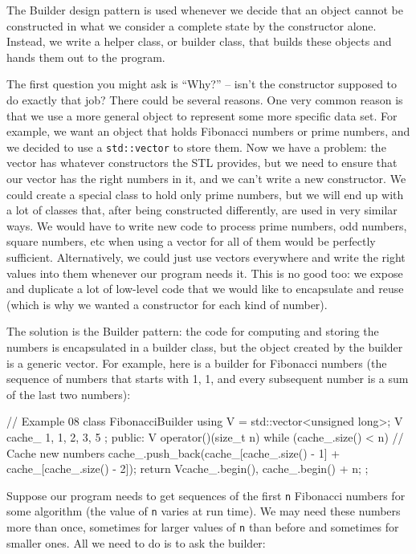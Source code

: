 The Builder design pattern is used whenever we decide that an object cannot be constructed in what we consider a complete state by the constructor alone. Instead, we write a helper class, or builder class, that builds these objects and hands them out to the program.

The first question you might ask is ``Why?'' -- isn't the constructor supposed to do exactly that job? There could be several reasons. One very common reason is that we use a more general object to represent some more specific data set. For example, we want an object that holds Fibonacci numbers or prime numbers, and we decided to use a \texttt{std::vector} to store them. Now we have a problem: the vector has whatever constructors the STL provides, but we need to ensure that our vector has the right numbers in it, and we can't write a new constructor. We could create a special class to hold only prime numbers, but we will end up with a lot of classes that, after being constructed differently, are used in very similar ways. We would have to write new code to process prime numbers, odd numbers, square numbers, etc when using a vector for all of them would be perfectly sufficient. Alternatively, we could just use vectors everywhere and write the right values into them whenever our program needs it. This is no good too: we expose and duplicate a lot of low-level code that we would like to encapsulate and reuse (which is why we wanted a constructor for each kind of number).

The solution is the Builder pattern: the code for computing and storing the numbers is encapsulated in a builder class, but the object created by the builder is a generic vector. For example, here is a builder for Fibonacci numbers (the sequence of numbers that starts with 1, 1, and every subsequent number is a sum of the last two numbers):

\begin{code}
// Example 08
class FibonacciBuilder {
  using V = std::vector<unsigned long>;
  V cache_ { 1, 1, 2, 3, 5 };
  public:
  V operator()(size_t n) {
    while (cache_.size() < n) {     // Cache new numbers
      cache_.push_back(cache_[cache_.size() - 1] +
                       cache_[cache_.size() - 2]);
    }
    return V{cache_.begin(), cache_.begin() + n};
  }
};
\end{code}

Suppose our program needs to get sequences of the first \texttt{n} Fibonacci numbers for some algorithm (the value of \texttt{n} varies at run time). We may need these numbers more than once, sometimes for larger values of \texttt{n} than before and sometimes for smaller ones. All we need to do is to ask the builder:

